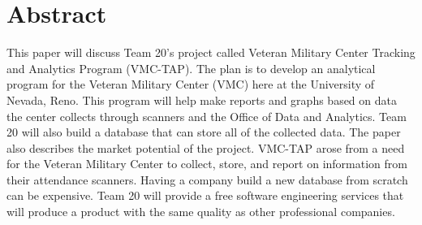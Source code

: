 \section{Abstract}
\label{sect:abstract}


This paper will discuss Team 20's project called Veteran Military Center Tracking and Analytics Program (VMC-TAP). The plan is to develop an analytical program for the Veteran Military Center (VMC) here at the University of Nevada, Reno. This program will help make reports and graphs based on data the center collects through scanners and the Office of Data and Analytics. Team 20 will also build a database that can store all of the collected data. The paper also describes the market potential of the project. VMC-TAP arose from a need for the Veteran Military Center to collect, store, and report on information from their attendance scanners. Having a company build a new database from scratch can be expensive. Team 20 will provide a free software engineering services that will produce a product with the same quality as other professional companies.


